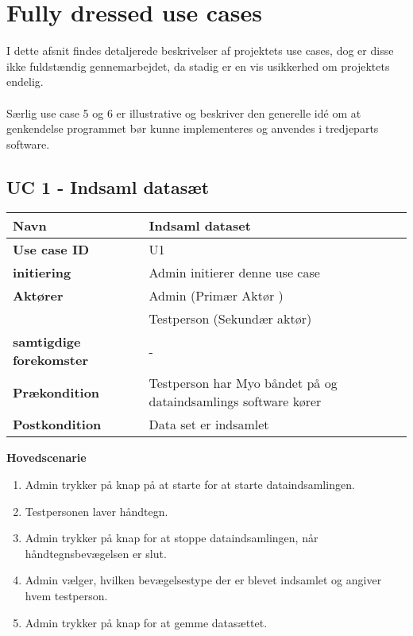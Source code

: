 \section{Fully dressed use cases}
I dette afsnit findes detaljerede beskrivelser af projektets use cases, dog er disse ikke fuldstændig gennemarbejdet, da stadig er en vis usikkerhed om projektets endelig.
\\ \\Særlig use case 5 og 6 er illustrative og beskriver den generelle idé om at genkendelse programmet bør kunne implementeres og anvendes i tredjeparts software.
\subsection{UC 1 - Indsaml datasæt}
\begin{table}[htbp] 
	\begin{tabular}{|p{5cm}|p{9cm}|}
		\hline
		\textbf{Navn} & Indsaml dataset \\ \hline
		\textbf{Use case ID} & U1 \\ \hline
		\textbf{initiering} & Admin initierer denne use case \\ \hline
		\textbf{Aktører} & Admin (Primær Aktør ) \\ & Testperson (Sekundær aktør) \\ \hline
		\textbf{samtigdige forekomster} & - \\ \hline
		\textbf{Prækondition} & Testperson har Myo båndet på og dataindsamlings software kører \\ \hline
		\textbf{Postkondition} & Data set er indsamlet \\ \hline
	\end{tabular}
\end{table}
\textbf{Hovedscenarie}
\begin{enumerate}
	\item Admin trykker på knap på at starte for at starte dataindsamlingen.
	\item Testpersonen laver håndtegn.
	\item Admin trykker på knap for at stoppe dataindsamlingen, når håndtegnsbevægelsen er slut.
	\item Admin vælger, hvilken bevægelsestype der er blevet indsamlet og angiver hvem testperson.
	\item Admin trykker på knap for at gemme datasættet.
\end{enumerate}

